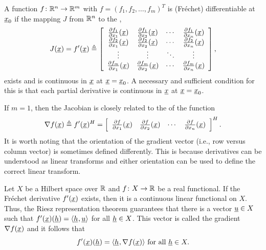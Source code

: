 \begin{example}
A function $f\colon \mathbb{R}^n \to \mathbb{R}^m$ with $f = (f_1,f_2,\ldots,f_m)^T$ is (Fr\'{e}chet) differentiable at $\underline{x}_0$ if the mapping $J$ from $\mathbb{R}^n$ to the ,
\[ J(\underline{x})=f'(\underline{x}) \triangleq \left[ \begin{array}{cccc} \frac{\partial  f_1}{\partial  x_1} (\underline{x}) & \frac{\partial  f_1}{\partial  x_2} (\underline{x}) & \cdots & \frac{\partial  f_1}{\partial  x_n} (\underline{x}) \\
\frac{\partial  f_2}{\partial  x_1} (\underline{x}) & \frac{\partial  f_2}{\partial  x_2} (\underline{x}) & \cdots & \frac{\partial  f_2}{\partial  x_n} (\underline{x}) \\
\vdots & \vdots & \ddots & \vdots \\
\frac{\partial  f_m}{\partial  x_1} (\underline{x}) & \frac{\partial  f_m}{\partial  x_2} (\underline{x}) & \cdots & \frac{\partial  f_m}{\partial  x_n} (\underline{x}) \end{array} \right], \]
exists and is continuous in $\underline{x}$ at $\underline{x}=\underline{x}_0$.
A necessary and sufficient condition for this is that each partial derivative is continuous in $\underline{x}$ at $\underline{x}=\underline{x}_0$.

If $m=1$, then the Jacobian is closely related to the  of the function
\[ \nabla f(\underline{x}) \triangleq f'(\underline{x})^H =  \left[ \begin{array}{cccc} \frac{\partial  f}{\partial  x_1} (\underline{x}) & \frac{\partial  f}{\partial  x_2} (\underline{x}) & \cdots & \frac{\partial  f}{\partial  x_n} (\underline{x}) \end{array} \right]^H . \]
It is worth noting that the orientation of the gradient vector (i.e., row versus column vector) is sometimes defined differently.
This is because derivatives can be understood as linear transforms and either orientation can be used to define the correct linear transform. 
\end{example}

\begin{example}
Let $X$ be a Hilbert space over $\mathbb{R}$ and $f\colon X \to \mathbb{R}$ be a real functional.
If the Fr\'{e}chet derivative $f'(\underline{x})$ exists, then it is a continuous linear functional on $X$.
Thus, the Riesz representation theorem guarantees that there is a vector $\underline{u} \in X$ such that
$ f'(\underline{x})(\underline{h}) = {\langle \underline{h}  \mskip1mu ,  \underline{u}  \rangle} $ for all $\underline{h}\in X$.
This vector is called the gradient $\nabla f(\underline{x})$ and it follows that
$$ f'(\underline{x})(\underline{h}) = {\langle \underline{h}  \mskip1mu ,  \nabla f (\underline{x})  \rangle} \text{ for all } \underline{h}\in X. $$
\end{example}

